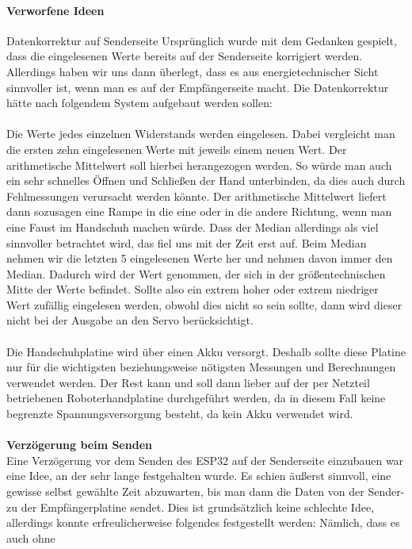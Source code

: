 \documentclass[titlepage,12pt,twoside]{article}
\begin{document}
\paragraph{Verworfene Ideen}
\hfill \break
\hfill \break
Datenkorrektur auf Senderseite
Ursprünglich wurde mit dem Gedanken gespielt, dass die eingelesenen Werte bereits auf der Senderseite korrigiert werden. 
Allerdings haben wir uns dann überlegt, dass es aus energietechnischer Sicht sinnvoller ist, wenn man es auf der Empfängerseite 
macht. Die Datenkorrektur hätte nach folgendem System aufgebaut werden sollen: \\
\\
Die Werte jedes einzelnen Widerstands werden eingelesen. Dabei vergleicht man die ersten zehn eingelesenen Werte mit jeweils 
einem neuen Wert. Der arithmetische Mittelwert soll hierbei herangezogen werden. So würde man auch ein sehr schnelles Öffnen 
und Schließen der Hand unterbinden, da dies auch durch Fehlmessungen verursacht werden könnte. Der arithmetische Mittelwert 
liefert dann sozusagen eine Rampe in die eine oder in die andere Richtung, wenn man eine Faust im Handschuh machen würde. Dass 
der Median allerdings als viel sinnvoller betrachtet wird, das fiel uns mit der Zeit erst auf. Beim Median nehmen wir die 
letzten 5 eingelesenen Werte her und nehmen davon immer den Median. Dadurch wird der Wert genommen, der sich in der 
größentechnischen Mitte der Werte befindet. Sollte also ein extrem hoher oder extrem niedriger Wert zufällig eingelesen werden, 
obwohl dies nicht so sein sollte, dann wird dieser nicht bei der Ausgabe an den Servo berücksichtigt. \\
\\
Die Handschuhplatine wird über einen Akku versorgt. Deshalb sollte diese Platine nur für die wichtigsten beziehungsweise 
nötigsten Messungen und Berechnungen verwendet werden. Der Rest kann und soll dann lieber auf der per Netzteil betriebenen 
Roboterhandplatine durchgeführt werden, da in diesem Fall keine begrenzte Spannungsversorgung besteht, da kein Akku verwendet 
wird. \\
\\
\textbf{Verzögerung beim Senden} 
\\
Eine Verzögerung vor dem Senden des ESP32 auf der Senderseite einzubauen war eine 
Idee, an der sehr lange festgehalten wurde. Es schien äußerst sinnvoll, eine 
gewisse selbst gewählte Zeit abzuwarten, bis man dann die Daten von der Sender- zu 
der Empfängerplatine sendet. Dies ist grundsätzlich keine schlechte Idee, allerdings 
konnte erfreulicherweise folgendes festgestellt werden: Nämlich, dass es auch ohne 
\end{document}
